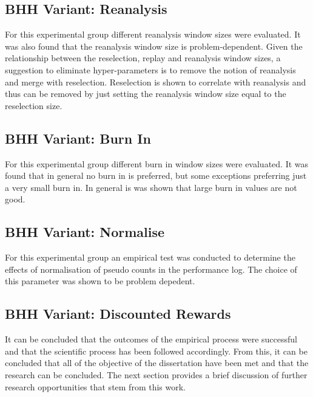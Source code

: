 \subsection{\ac{BHH} Variant: Reanalysis}
\label{sec:conclusion:results:summary:reanalysis}

For this experimental group different reanalysis window sizes were evaluated. It was also found that the reanalysis window size is problem-dependent. Given the relationship between the reselection, replay and reanalysis window sizes, a suggestion to eliminate hyper-parameters is to remove the notion of reanalysis and merge with reselection. Reselection is shown to correlate with reanalysis and thus can be removed by just setting the reanalysis window size equal to the reselection size.

\subsection{\ac{BHH} Variant: Burn In}
\label{sec:conclusion:results:summary:burn_in}

For this experimental group different burn in window sizes were evaluated. It was found that in general no burn in is preferred, but some exceptions preferring just a very small burn in. In general is was shown that large burn in values are not good.

\subsection{\ac{BHH} Variant: Normalise}
\label{sec:conclusion:results:summary:normalise}

For this experimental group an empirical test was conducted to determine the effects of normalisation of pseudo counts in the performance log. The choice of this parameter was shown to be problem depedent.

\subsection{\ac{BHH} Variant: Discounted Rewards}
\label{sec:conclusion:results:summary:discounted_rewards}

It can be concluded that the outcomes of the empirical process were successful and that the scientific process has been followed accordingly. From this, it can be concluded that all of the objective of the dissertation have been met and that the research can be concluded. The next section provides a brief discussion of further research opportunities that stem from this work.

